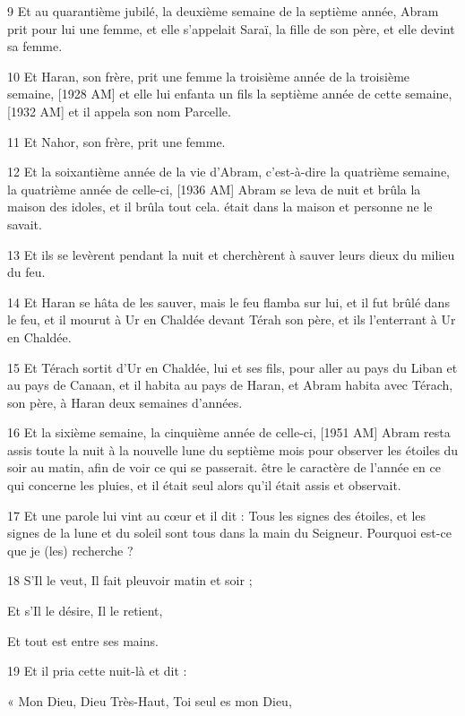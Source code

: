 \par 9 Et au quarantième jubilé, la deuxième semaine de la septième année, Abram prit pour lui une femme, et elle s'appelait Saraï, la fille de son père, et elle devint sa femme.
\par 10 Et Haran, son frère, prit une femme la troisième année de la troisième semaine, [1928 AM] et elle lui enfanta un fils la septième année de cette semaine, [1932 AM] et il appela son nom Parcelle.
\par 11 Et Nahor, son frère, prit une femme.
\par 12 Et la soixantième année de la vie d'Abram, c'est-à-dire la quatrième semaine, la quatrième année de celle-ci, [1936 AM] Abram se leva de nuit et brûla la maison des idoles, et il brûla tout cela. était dans la maison et personne ne le savait.
\par 13 Et ils se levèrent pendant la nuit et cherchèrent à sauver leurs dieux du milieu du feu.
\par 14 Et Haran se hâta de les sauver, mais le feu flamba sur lui, et il fut brûlé dans le feu, et il mourut à Ur en Chaldée devant Térah son père, et ils l'enterrant à Ur en Chaldée.
\par 15 Et Térach sortit d'Ur en Chaldée, lui et ses fils, pour aller au pays du Liban et au pays de Canaan, et il habita au pays de Haran, et Abram habita avec Térach, son père, à Haran deux semaines d'années.
\par 16 Et la sixième semaine, la cinquième année de celle-ci, [1951 AM] Abram resta assis toute la nuit à la nouvelle lune du septième mois pour observer les étoiles du soir au matin, afin de voir ce qui se passerait. être le caractère de l'année en ce qui concerne les pluies, et il était seul alors qu'il était assis et observait.
\par 17 Et une parole lui vint au cœur et il dit : Tous les signes des étoiles, et les signes de la lune et du soleil sont tous dans la main du Seigneur. Pourquoi est-ce que je (les) recherche ?
\par    
\par 18 S'Il le veut, Il fait pleuvoir matin et soir ;  
\par     Et s’Il le désire, Il le retient,  
\par     Et tout est entre ses mains.
\par    
\par 19 Et il pria cette nuit-là et dit :  
\par     « Mon Dieu, Dieu Très-Haut, Toi seul es mon Dieu,  
